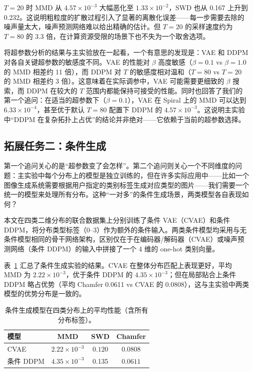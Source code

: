 \documentclass[UTF8,a4paper,12pt]{ctexart}
\begin{document}
$T=20$ 时 MMD 从 $4.57\times 10^{-3}$ 大幅恶化至 $1.33\times 10^{-2}$，SWD 也从 0.167 上升到 0.232。这说明粗粒度的扩散过程引入了显著的离散化误差——每一步需要去除的噪声量太大，噪声预测网络难以给出精确的估计。但 $T=20$ 的采样速度约为 $T=80$ 的 3.3 倍，在计算资源受限的场景下也不失为一个取舍选项。

将超参数分析的结果与主实验放在一起看，一个有意思的发现是：VAE 和 DDPM 对各自关键超参数的敏感度不同。VAE 的性能对 $\beta$ 高度敏感（$\beta=0.1$ vs $\beta=1.0$ 的 MMD 相差约 11 倍），而 DDPM 对 $T$ 的敏感度相对温和（$T=80$ vs $T=20$ 的 MMD 相差约 3 倍）。这意味着在实际调参中，VAE 可能需要更细致的 $\beta$ 搜索，而 DDPM 在较大的 $T$ 范围内都能保持可接受的性能。同时也回答了我们的第一个追问：在适当的超参数下（$\beta=0.1$），VAE 在 Spiral 上的 MMD 可以达到 $6.33\times 10^{-4}$，甚至优于默认 $T=80$ 配置下 DDPM 的 $4.57\times 10^{-3}$。这说明主实验中“DDPM 在复杂拓扑上占优”的结论并非绝对——它依赖于当前的超参数选择。

\subsection{拓展任务二：条件生成}

第一个追问关心的是“超参数变了会怎样”。第二个追问则关心一个不同维度的问题：主实验中每个分布上的模型是独立训练的，但在许多实际应用中——比如一个图像生成系统需要根据用户指定的类别标签生成对应类型的图片——我们需要一个统一的模型来处理所有分布。这种“一对多”的条件生成场景，两类模型各自表现如何？

本文在四类二维分布的联合数据集上分别训练了条件 VAE（CVAE）和条件 DDPM，将分布类型标签（0--3）作为额外的条件输入。两类条件模型均采用与无条件模型相同的骨干网络架构，区别仅在于在编码器/解码器（CVAE）或噪声预测网络（条件 DDPM）的输入中拼接了一个 4 维的 one-hot 类别向量。

表~\ref{tab:conditional} 汇总了条件生成实验的结果。CVAE 在整体分布匹配上表现更好，平均 MMD 为 $2.22\times 10^{-3}$，优于条件 DDPM 的 $4.35\times 10^{-3}$；但在局部贴合上条件 DDPM 略占优势（平均 Chamfer 0.0611 vs CVAE 的 0.0808），这与主实验中两类模型的优势分布是一致的。

\begin{table}[H]
\centering
\small
\caption{条件生成模型在四类分布上的平均性能（含所有分布标签）。}
\label{tab:conditional}
\begin{tabular}{lccc}
\toprule
模型 & MMD & SWD  & Chamfer \\
\midrule
CVAE & $\mathbf{2.22}\times 10^{-3}$ & $\mathbf{0.120}$ & 0.0808 \\
条件 DDPM & $4.35\times 10^{-3}$ & 0.135 & $\mathbf{0.0611}$ \\
\bottomrule
\end{tabular}
\end{table}
\end{document}
